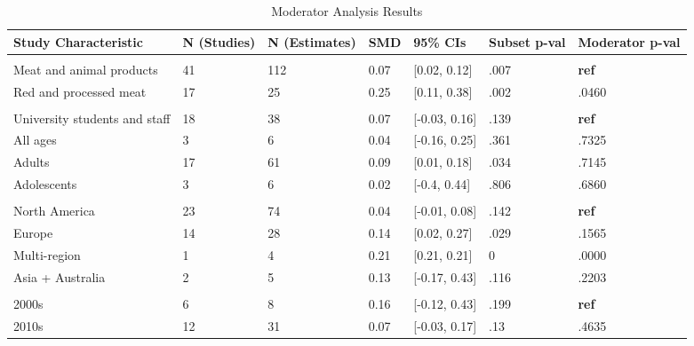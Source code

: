 \documentclass[sn-nature,referee,pdflatex]{sn-jnl}
\begin{document}
\begin{table}[!ht]
\centering
\caption{\label{tab:table_two}Moderator Analysis Results}
\centering
\begin{tabular}[t]{lllllll}
\toprule
Study Characteristic & N (Studies) & N (Estimates) & SMD & 95\% CIs & Subset p-val & Moderator p-val\\
\midrule
\addlinespace[0.3em]
\multicolumn{7}{l}{\textbf{Outcome}}\\
\hspace{1em}Meat and animal products & 41 & 112 & 0.07 & {}[0.02, 0.12] & .007 & \textbf{ref}\\
\hspace{1em}Red and processed meat & 17 & 25 & 0.25 & {}[0.11, 0.38] & .002 & .0460\\
\addlinespace[0.3em]
\multicolumn{7}{l}{\textbf{Population}}\\
\hspace{1em}University students and staff & 18 & 38 & 0.07 & {}[-0.03, 0.16] & .139 & \textbf{ref}\\
\hspace{1em}All ages & 3 & 6 & 0.04 & {}[-0.16, 0.25] & .361 & .7325\\
\hspace{1em}Adults & 17 & 61 & 0.09 & {}[0.01, 0.18] & .034 & .7145\\
\hspace{1em}Adolescents & 3 & 6 & 0.02 & {}[-0.4, 0.44] & .806 & .6860\\
\addlinespace[0.3em]
\multicolumn{7}{l}{\textbf{Region}}\\
\hspace{1em}North America & 23 & 74 & 0.04 & {}[-0.01, 0.08] & .142 & \textbf{ref}\\
\hspace{1em}Europe & 14 & 28 & 0.14 & {}[0.02, 0.27] & .029 & .1565\\
\hspace{1em}Multi-region & 1 & 4 & 0.21 & {}[0.21, 0.21] & 0 & .0000\\
\hspace{1em}Asia + Australia & 2 & 5 & 0.13 & {}[-0.17, 0.43] & .116 & .2203\\
\addlinespace[0.3em]
\multicolumn{7}{l}{\textbf{Publication Decade}}\\
\hspace{1em}2000s & 6 & 8 & 0.16 & {}[-0.12, 0.43] & .199 & \textbf{ref}\\
\hspace{1em}2010s & 12 & 31 & 0.07 & {}[-0.03, 0.17] & .13 & .4635\\

\end{tabular}
\end{table}
\end{document}
